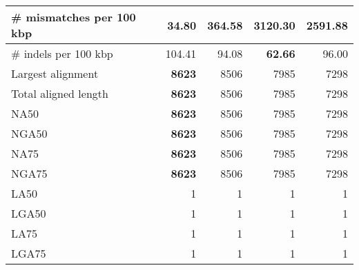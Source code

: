 \documentclass[12pt,a4paper]{article}
\begin{document}
\begin{table}[ht]
\begin{center}
\begin{tabular}{|l*{4}{|r}|}
\# mismatches per 100 kbp & {\bf 34.80} & 364.58 & 3120.30 & 2591.88 \\ \hline
\# indels per 100 kbp & 104.41 & 94.08 & {\bf 62.66} & 96.00 \\ \hline
Largest alignment & {\bf 8623} & 8506 & 7985 & 7298 \\ \hline
Total aligned length & {\bf 8623} & 8506 & 7985 & 7298 \\ \hline
NA50 & {\bf 8623} & 8506 & 7985 & 7298 \\ \hline
NGA50 & {\bf 8623} & 8506 & 7985 & 7298 \\ \hline
NA75 & {\bf 8623} & 8506 & 7985 & 7298 \\ \hline
NGA75 & {\bf 8623} & 8506 & 7985 & 7298 \\ \hline
LA50 & 1 & 1 & 1 & 1 \\ \hline
LGA50 & 1 & 1 & 1 & 1 \\ \hline
LA75 & 1 & 1 & 1 & 1 \\ \hline
LGA75 & 1 & 1 & 1 & 1 \\ \hline
\end{tabular}
\end{center}
\end{table}
\end{document}
